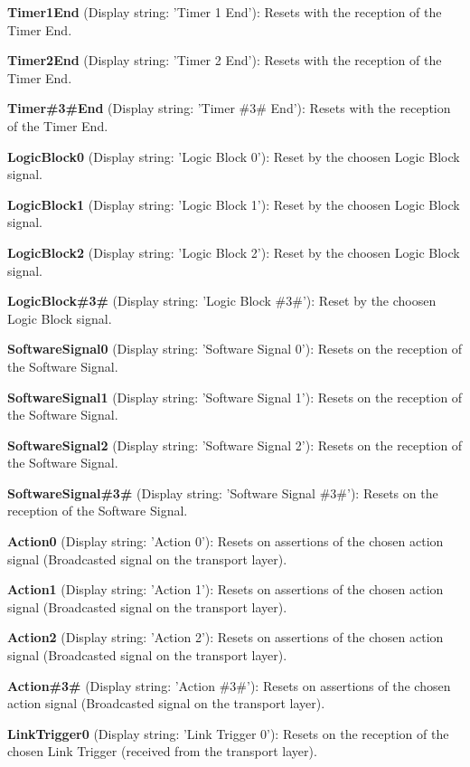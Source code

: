 \begin{DoxyItemize}
\item {\bfseries Timer1\+End} (Display string\+: 'Timer 1 End')\+: Resets with the reception of the Timer End.
\item {\bfseries Timer2\+End} (Display string\+: 'Timer 2 End')\+: Resets with the reception of the Timer End.
\item {\bfseries Timer\#3\#End} (Display string\+: 'Timer \#3\# End')\+: Resets with the reception of the Timer End.
\item {\bfseries Logic\+Block0} (Display string\+: 'Logic Block 0')\+: Reset by the choosen Logic Block signal.
\item {\bfseries Logic\+Block1} (Display string\+: 'Logic Block 1')\+: Reset by the choosen Logic Block signal.
\item {\bfseries Logic\+Block2} (Display string\+: 'Logic Block 2')\+: Reset by the choosen Logic Block signal.
\item {\bfseries Logic\+Block\#3\#} (Display string\+: 'Logic Block \#3\#')\+: Reset by the choosen Logic Block signal.
\item {\bfseries Software\+Signal0} (Display string\+: 'Software Signal 0')\+: Resets on the reception of the Software Signal.
\item {\bfseries Software\+Signal1} (Display string\+: 'Software Signal 1')\+: Resets on the reception of the Software Signal.
\item {\bfseries Software\+Signal2} (Display string\+: 'Software Signal 2')\+: Resets on the reception of the Software Signal.
\item {\bfseries Software\+Signal\#3\#} (Display string\+: 'Software Signal \#3\#')\+: Resets on the reception of the Software Signal.
\item {\bfseries Action0} (Display string\+: 'Action 0')\+: Resets on assertions of the chosen action signal (Broadcasted signal on the transport layer).
\item {\bfseries Action1} (Display string\+: 'Action 1')\+: Resets on assertions of the chosen action signal (Broadcasted signal on the transport layer).
\item {\bfseries Action2} (Display string\+: 'Action 2')\+: Resets on assertions of the chosen action signal (Broadcasted signal on the transport layer).
\item {\bfseries Action\#3\#} (Display string\+: 'Action \#3\#')\+: Resets on assertions of the chosen action signal (Broadcasted signal on the transport layer).
\item {\bfseries Link\+Trigger0} (Display string\+: 'Link Trigger 0')\+: Resets on the reception of the chosen Link Trigger (received from the transport layer).

\end{DoxyItemize}
